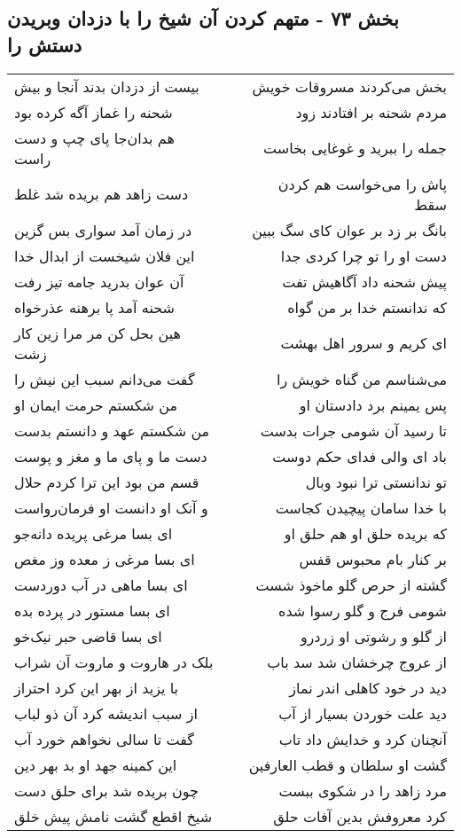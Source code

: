 \begin{center}
\section*{بخش ۷۳ - متهم کردن آن شیخ را با دزدان وبریدن دستش را}
\label{sec:sh073}
\begin{longtable}{l p{0.5cm} r}
بیست از دزدان بدند آنجا و بیش
&&
بخش می‌کردند مسروقات خویش
\\
شحنه را غماز آگه کرده بود
&&
مردم شحنه بر افتادند زود
\\
هم بدان‌جا پای چپ و دست راست
&&
جمله را ببرید و غوغایی بخاست
\\
دست زاهد هم بریده شد غلط
&&
پاش را می‌خواست هم کردن سقط
\\
در زمان آمد سواری بس گزین
&&
بانگ بر زد بر عوان کای سگ ببین
\\
این فلان شیخست از ابدال خدا
&&
دست او را تو چرا کردی جدا
\\
آن عوان بدرید جامه تیز رفت
&&
پیش شحنه داد آگاهیش تفت
\\
شحنه آمد پا برهنه عذرخواه
&&
که ندانستم خدا بر من گواه
\\
هین بحل کن مر مرا زین کار زشت
&&
ای کریم و سرور اهل بهشت
\\
گفت می‌دانم سبب این نیش را
&&
می‌شناسم من گناه خویش را
\\
من شکستم حرمت ایمان او
&&
پس یمینم برد دادستان او
\\
من شکستم عهد و دانستم بدست
&&
تا رسید آن شومی جرات بدست
\\
دست ما و پای ما و مغز و پوست
&&
باد ای والی فدای حکم دوست
\\
قسم من بود این ترا کردم حلال
&&
تو ندانستی ترا نبود وبال
\\
و آنک او دانست او فرمان‌رواست
&&
با خدا سامان پیچیدن کجاست
\\
ای بسا مرغی پریده دانه‌جو
&&
که بریده حلق او هم حلق او
\\
ای بسا مرغی ز معده وز مغص
&&
بر کنار بام محبوس قفس
\\
ای بسا ماهی در آب دوردست
&&
گشته از حرص گلو ماخوذ شست
\\
ای بسا مستور در پرده بده
&&
شومی فرج و گلو رسوا شده
\\
ای بسا قاضی حبر نیک‌خو
&&
از گلو و رشوتی او زردرو
\\
بلک در هاروت و ماروت آن شراب
&&
از عروج چرخشان شد سد باب
\\
با یزید از بهر این کرد احتراز
&&
دید در خود کاهلی اندر نماز
\\
از سبب اندیشه کرد آن ذو لباب
&&
دید علت خوردن بسیار از آب
\\
گفت تا سالی نخواهم خورد آب
&&
آنچنان کرد و خدایش داد تاب
\\
این کمینه جهد او بد بهر دین
&&
گشت او سلطان و قطب العارفین
\\
چون بریده شد برای حلق دست
&&
مرد زاهد را در شکوی ببست
\\
شیخ اقطع گشت نامش پیش خلق
&&
کرد معروفش بدین آفات حلق
\\
\end{longtable}
\end{center}
